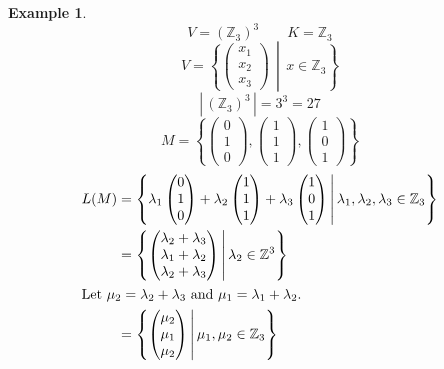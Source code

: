 \documentclass[a4paper,landscape,twocolumn]{article}
\newcommand\set[1]{\left\{#1\right\}}
\newcommand\setdef[2]{\left\{#1\,\middle|\,#2\right\}}
\newcommand\card[1]{\left|\,#1\,\right|}
\newtheorem{ex}{Example}
\begin{document}
\begin{ex}
  \[ V = (\mathbb Z_3)^3 \qquad K = \mathbb Z_3 \]
  \[ V = \setdef{\begin{pmatrix} x_1 \\ x_2 \\ x_3 \end{pmatrix}}{x \in \mathbb Z_3} \]
  \[ \card{(\mathbb Z_3)^3} = 3^3 = 27 \]
  \[ M = \set{\begin{pmatrix} 0 \\ 1 \\ 0 \end{pmatrix}, \begin{pmatrix} 1 \\ 1 \\ 1 \end{pmatrix}, \begin{pmatrix} 1 \\ 0 \\ 1 \end{pmatrix}} \]
  \begin{align*}
    L(M) &= \setdef{%
      \lambda_1 \begin{pmatrix} 0 \\ 1 \\ 0 \end{pmatrix}
      + \lambda_2 \begin{pmatrix} 1 \\ 1 \\ 1 \end{pmatrix}
      + \lambda_3 \begin{pmatrix} 1 \\ 0 \\ 1 \end{pmatrix}%
    }{\lambda_1, \lambda_2, \lambda_3 \in \mathbb Z_3} \\
    &= \setdef{%
      \begin{pmatrix} \lambda_2 + \lambda_3 \\ \lambda_1 + \lambda_2 \\ \lambda_2 + \lambda_3 \end{pmatrix}
    }{\lambda_2 \in \mathbb Z^3} \\
  \intertext{Let $\mu_2 = \lambda_2 + \lambda_3$ and $\mu_1 = \lambda_1 + \lambda_2$.}
    &= \setdef{\begin{pmatrix}\mu_2 \\ \mu_1 \\ \mu_2 \end{pmatrix}}{\mu_1, \mu_2 \in \mathbb Z_3} \\

\end{align*}
\end{ex}
\end{document}
